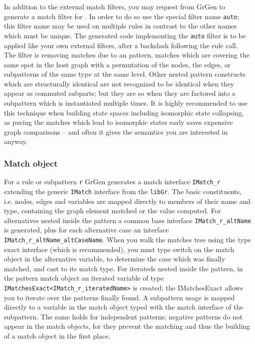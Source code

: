 In addition to the external match filters, you may request from GrGen to generate a match filter for .
In order to do so use the special filter name \texttt{auto}; this filter name may be used on multiple rules in contrast to the other names which must be unique.
The generated code implementing the \texttt{auto} filter is to be applied like your own external filters, after a backslash following the rule call.
The filter is removing matches due to an  pattern, matches which are covering the same spot in the host graph with a permutation of the nodes, the edges, or subpatterns of the same type at the same level.
Other nested pattern constructs which are structurally identical are not recognized to be identical when they appear as commuted subparts; but they are so when they are factored into a subpattern which is instantiated multiple times.
It is highly recommended to use this  technique when building state spaces including isomorphic state collapsing, as puring the matches which lead to isomorphic states early saves expensive graph comparisons -- and often it gives the semantics you are interested in anyway.

\subsubsection*{Match object}

For a rule or subpattern \texttt{r} GrGen generates a match interface \texttt{IMatch\_r} extending the generic \texttt{IMatch} interface from the \texttt{libGr}.
The basic constituents, i.e. nodes, edges and variables are mapped directly to members of their name and type, containing the graph element matched or the value computed.
For alternatives nested inside the pattern a common base interface \texttt{IMatch\_r\_altName} is generated, plus for each alternative case an interface \texttt{IMatch\_r\_altName\_altCaseName}. When you walk the matches tree using the type exact interface (which is recommended), you must type switch on the match object in the alternative variable, to determine the case which was finally matched, and cast to its match type.
For iterateds nested inside the pattern, in the pattern match object an iterated variable of type \texttt{IMatchesExact<IMatch\_r\_iteratedName>} is created; the IMatchesExact allows you to iterate over the patterns finally found. 
A subpattern usage is mapped directly to a variable in the match object typed with the match interface of the subpattern.
The same holds for independent patterns; negative patterns do not appear in the match objects, for they prevent the matching and thus the building of a match object in the first place.

